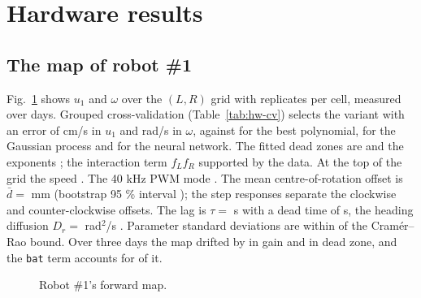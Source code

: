 \section{Hardware results}\label{sec:hardware-results}


\subsection{The map of robot \#1}\label{sec:hw-map}

Fig.~\ref{fig:map} shows \(u_1\) and \(\omega\) over the \((L,R)\) grid
with  replicates per cell, measured over  days. Grouped
cross-validation (Table~\ref{tab:hw-cv}) selects the  variant with an error of  cm/s in \(u_1\) and 
rad/s in \(\omega\), against  for the best polynomial,  for the Gaussian process and  for the neural network. The
fitted dead zones are  and the exponents ; the interaction term \(f_L f_R\)  supported by
the data. At the top of the grid the speed . The 40 kHz PWM mode . The mean centre-of-rotation offset
is \(\bar d = \)  mm (bootstrap 95 \% interval ); the
step responses  separate the clockwise and
counter-clockwise offsets. The lag is \(\tau = \)  s with a dead
time of  s, the heading diffusion \(D_r = \)  rad\(^2\)/s
. Parameter standard deviations are within 
of the Cramér--Rao bound. Over three days the map drifted by 
in gain and  in dead zone, and the \texttt{bat} term accounts
for  of it.

\begin{figure}[t]
\centering
{}
\caption{Robot \#1's forward map. }
\label{fig:map}
\end{figure}

